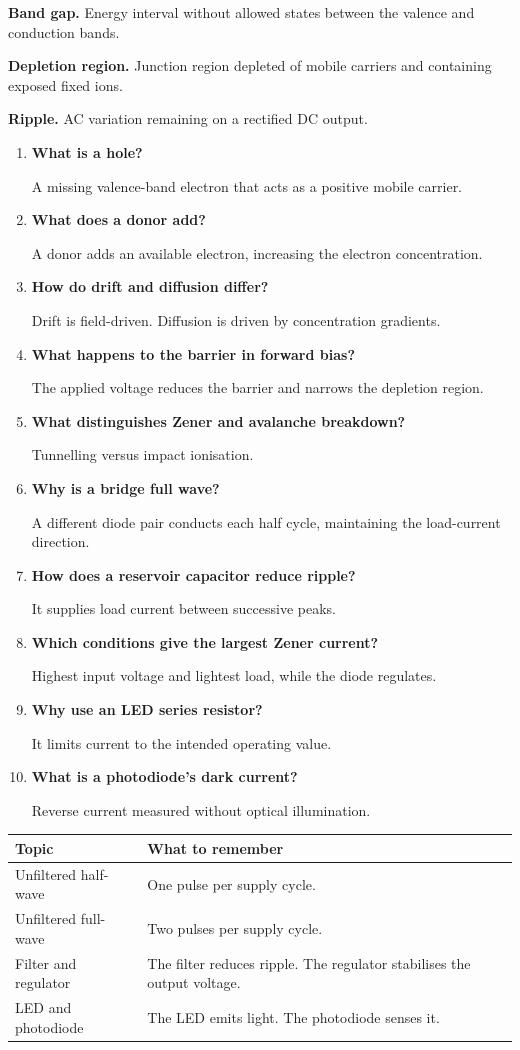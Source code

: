 \documentclass[12pt,a4paper]{article}
\newcommand{\Q}[1]{\textbf{#1}\par\noindent\ignorespaces}
\begin{document}
\begin{tcolorbox}[defbox, title={One-Line Definitions}]
\textbf{Band gap.} Energy interval without allowed states between the valence and conduction bands.

\textbf{Depletion region.} Junction region depleted of mobile carriers and containing exposed fixed ions.

\textbf{Ripple.} AC variation remaining on a rectified DC output.
\end{tcolorbox}

\begin{tcolorbox}[exambox, title={Frequently Asked / Viva Questions}]
\begin{enumerate}[topsep=0pt, label=\textbf{Q\arabic*.}, itemsep=5pt]
  \item \Q{What is a hole?} A missing valence-band electron that acts as a positive mobile carrier.
  \item \Q{What does a donor add?} A donor adds an available electron, increasing the electron concentration.
  \item \Q{How do drift and diffusion differ?} Drift is field-driven. Diffusion is driven by concentration gradients.
  \item \Q{What happens to the barrier in forward bias?} The applied voltage reduces the barrier and narrows the depletion region.
  \item \Q{What distinguishes Zener and avalanche breakdown?} Tunnelling versus impact ionisation.
  \item \Q{Why is a bridge full wave?} A different diode pair conducts each half cycle, maintaining the load-current direction.
  \item \Q{How does a reservoir capacitor reduce ripple?} It supplies load current between successive peaks.
  \item \Q{Which conditions give the largest Zener current?} Highest input voltage and lightest load, while the diode regulates.
  \item \Q{Why use an LED series resistor?} It limits current to the intended operating value.
  \item \Q{What is a photodiode's dark current?} Reverse current measured without optical illumination.
\end{enumerate}
\end{tcolorbox}

\begin{tcolorbox}[tikzbox, title={Summary Reference}]
\begin{tabularx}{\linewidth}{|B{4.0cm}|Y|}\hline
Topic & \textbf{What to remember} \\ \hline
Unfiltered half-wave & One pulse per supply cycle. \\ \hline
Unfiltered full-wave & Two pulses per supply cycle. \\ \hline
Filter and regulator & The filter reduces ripple. The regulator stabilises the output voltage. \\ \hline
LED and photodiode & The LED emits light. The photodiode senses it. \\ \hline
\end{tabularx}
\end{tcolorbox}
\end{document}
